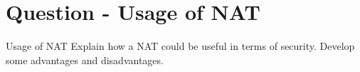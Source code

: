 \section{Question - Usage of NAT}

\begin{questionBox}{Usage of NAT}
    Explain how a NAT could be useful in terms of security. Develop some advantages and disadvantages.
\end{questionBox}
